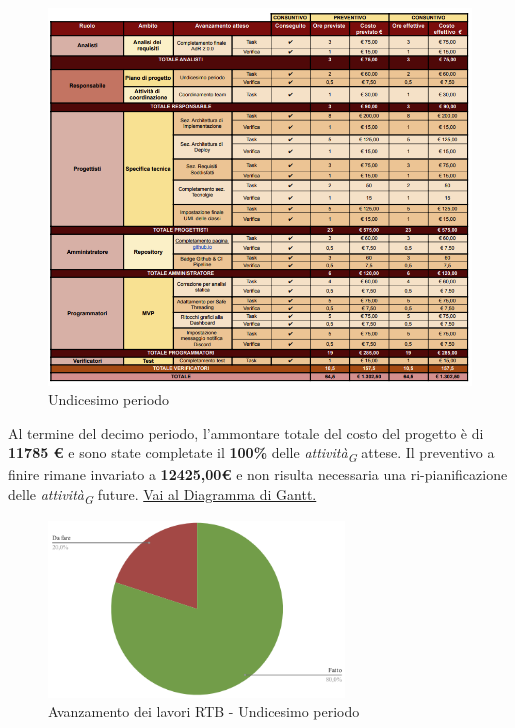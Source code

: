 \begin{figure}[H]
    \centering
    \includegraphics[height=0.9\textwidth]{../Images/tabG11.PNG}
    \caption{Undicesimo periodo}
    \label{fig:Undicesimo_periodo}
\end{figure}

Al termine del decimo periodo, l'ammontare totale del costo del progetto è di \textbf{11785 \euro} e sono state completate il \textbf{100\%} delle \textit{attività}\textsubscript{\textit{G}} attese.
Il preventivo a finire rimane invariato a \textbf{12425,00\euro} e non risulta necessaria una ri-pianificazione delle \textit{attività}\textsubscript{\textit{G}} future.
\href{https://github.com/orgs/ByteOps-swe/projects/3/views/1?sortedBy%5Bdirection%5D=asc&sortedBy%5BcolumnId%5D=64182560}{Vai al Diagramma di Gantt.}

\begin{figure}[H]
    \centering
    \begin{minipage}[b]{0.70\textwidth}
        \centering
        \includegraphics[width=0.7\textwidth]{../Images/torta11.png}
        \caption{Avanzamento dei lavori RTB - Undicesimo periodo}
        \label{fig:Avanzamento_RTB_11}
    \end{minipage}
\end{figure}

